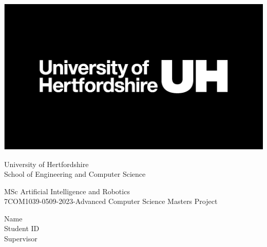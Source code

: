 \begin{titlepage}
	\makeatletter
	\sffamily\selectfont
	\begin{center}
	
	\includegraphics[width=0.3\linewidth]{images/UH_logo} 
	
	\vspace{0.5cm}
	
	
	{\Large
		University of Hertfordshire\\
		\vspace{1cm}
		School of Engineering and Computer Science
	 }
	
	\vspace{1cm}
	\normalfont\selectfont
	\bfseries
	
	{%
		MSc Artificial Intelligence and Robotics \\ 
		7COM1039-0509-2023-Advanced Computer Science Masters Project\\
		}
		
	\vspace{3cm}
		
	 {\fontsize{40}{60} \selectfont	
		\@title
	}
	
	\vspace{3.5cm}
	
	
	\vfill
	\end{center}


{\large Name  \hfill \@author \\
 Student ID \hfill \id}\\
 {\normalsize Supervisor \hfill \supervisorname}

	\normalfont
\end{titlepage}
